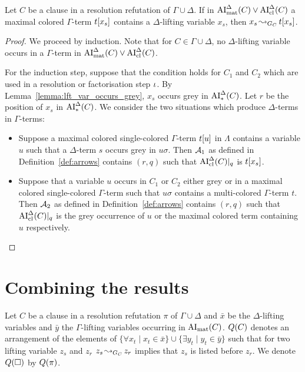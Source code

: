 \documentclass[,%
	draft=false,%
	numbers=noendperiod
	11pt,
	a4paper,
	oneside,%
	openany,
]{memoir}
\begin{document}
\begin{lemma}
	\label{lemma:arrow_for_lft_var}
	Let $C$ be a clause in a resolution refutation of $\Gamma \cup \Delta$.
	If in $\operatorname{AI}_\mathrm{mat}^\Delta(C) \lor \operatorname{AI}_\mathrm{cl}^\Delta(C)$	a maximal colored $\Gamma$-term $t[x_s]$ contains a $\Delta$-lifting variable $x_s$,
	then $x_s \operatorname{\leadsto}_{G_C} t[x_s]$.
\end{lemma}
\begin{proof}
	We proceed by induction. Note that for $C\in\Gamma\cup\Delta$, no $\Delta$-lifting variable occurs in a $\Gamma$-term in $\operatorname{AI}_\mathrm{mat}^\Delta(C) \lor \operatorname{AI}_\mathrm{cl}^\Delta(C)$.

	For the induction step, suppose that the condition holds for $C_1$ and $C_2$ which are used in a resolution or factorisation step $\iota$.
	By Lemma~\ref{lemma:lft_var_occurs_grey}, $x_s$ occurs grey in $\operatorname{AI}_\mathrm{*}^\Delta(C)$. Let $r$ be the position of $x_s$ in $\operatorname{AI}_\mathrm{*}^\Delta(C)$.
	We consider the two situations which produce $\Delta$-terms in $\Gamma$-terms:
	\begin{itemize}
		\item Suppose a maximal colored single-colored $\Gamma$-term $t[u]$ in $\Lambda$ contains a variable $u$ such that a $\Delta$-term $s$ occurs grey in $u\sigma$.
			Then $\operatorname{\mathcal{A}}_1$ as defined in Definition~\ref{def:arrows} contains $(r, q)$ such that $\operatorname{AI}_\mathrm{cl}^\Delta(C)|_{q}$ is $t[x_s]$.

		\item
			Suppose that a variable $u$ occurs in $C_1$ or $C_2$ either grey or in a maximal colored single-colored $\Gamma$-term such that $u\sigma$ contains a multi-colored $\Gamma$-term $t$.
			Then $\operatorname{\mathcal{A}}_2$ as defined in Definition~\ref{def:arrows} contains $(r, q)$ such that $\operatorname{AI}_\mathrm{cl}^\Delta(C)|_{q}$ is the grey occurrence of $u$ or the maximal colored term containing $u$ respectively.
			\qedhere
	\end{itemize}

\end{proof}



\section{Combining the results}

\begin{defi}
	\label{def:arrow_quantifier_block}
	Let $C$ be a clause in a resolution refutation $\pi$ of $\Gamma\cup\Delta$
	and $\bar x$ be the $\Delta$-lifting variables and $\bar y$ the $\Gamma$-lifting variables occurring in $\operatorname{AI}_\mathrm{mat}(C)$.
	$Q(C)$ denotes an arrangement of the elements of  $\{ \forall x_t \mid x_t \in \bar x\} \cup \{ \exists y_t \mid y_t \in \bar y\}$ such that for two lifting variable $z_s$ and $z_r$ $z_s \operatorname{\leadsto}_{G_C} z_r$ implies that $z_s$ is listed before $z_r$.
	We denote $Q(\square)$ by $Q(\pi)$.
\end{defi}
\end{document}
